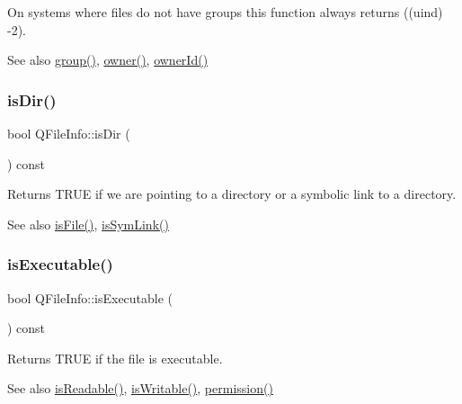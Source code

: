 On systems where files do not have groups this function always returns ((uind) -\/2).

\begin{DoxySeeAlso}{See also}
\mbox{\hyperlink{class_q_file_info_afb46f8fb3080ab0b32b4236436624ea3}{group()}}, \mbox{\hyperlink{class_q_file_info_a96831b45809e905dc14e5c065bfa8421}{owner()}}, \mbox{\hyperlink{class_q_file_info_ab963b7409fa73f7cc31aaff794015c4f}{owner\+Id()}} 
\end{DoxySeeAlso}
\mbox{\label{class_q_file_info_a91a725dd517a4b77b15077e72a7a1501}} 
\subsubsection{\texorpdfstring{isDir()}{isDir()}}
{\footnotesize\ttfamily bool Q\+File\+Info\+::is\+Dir (\begin{DoxyParamCaption}{ }\end{DoxyParamCaption}) const}

Returns T\+R\+UE if we are pointing to a directory or a symbolic link to a directory. \begin{DoxySeeAlso}{See also}
\mbox{\hyperlink{class_q_file_info_a6bc9021370d012084b9464ba22172d46}{is\+File()}}, \mbox{\hyperlink{class_q_file_info_a0e8114893edbe9d471b6f1389add29fd}{is\+Sym\+Link()}} 
\end{DoxySeeAlso}
\mbox{\label{class_q_file_info_a5b834ba486c5f6da3b429751ee84fd12}} 
\subsubsection{\texorpdfstring{isExecutable()}{isExecutable()}}
{\footnotesize\ttfamily bool Q\+File\+Info\+::is\+Executable (\begin{DoxyParamCaption}{ }\end{DoxyParamCaption}) const}

Returns T\+R\+UE if the file is executable. \begin{DoxySeeAlso}{See also}
\mbox{\hyperlink{class_q_file_info_af8795a46c49f6911a14f66218949f213}{is\+Readable()}}, \mbox{\hyperlink{class_q_file_info_ab2dcfc1ea9764ea5e6ea9cc684156c92}{is\+Writable()}}, \mbox{\hyperlink{class_q_file_info_a51ec346b961f115fd7e45664d27862db}{permission()}} 
\end{DoxySeeAlso}
\mbox{\label{class_q_file_info_a6bc9021370d012084b9464ba22172d46}} 
